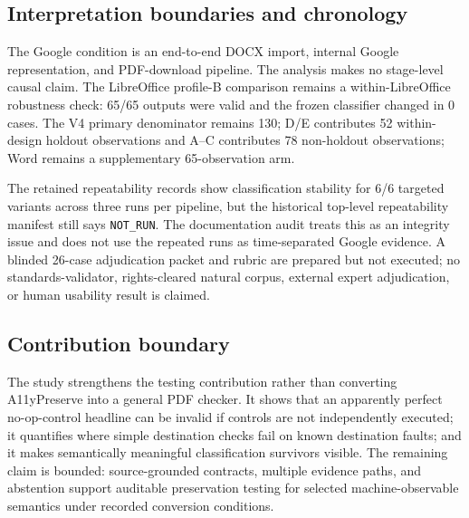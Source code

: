 \subsection{Interpretation boundaries and chronology}
The Google condition is an end-to-end DOCX import, internal Google representation, and PDF-download pipeline. The analysis makes no stage-level causal claim. The LibreOffice profile-B comparison remains a within-LibreOffice robustness check: 65/65 outputs were valid and the frozen classifier changed in 0 cases. The V4 primary denominator remains 130; D/E contributes 52 within-design holdout observations and A--C contributes 78 non-holdout observations; Word remains a supplementary 65-observation arm.

The retained repeatability records show classification stability for 6/6 targeted variants across three runs per pipeline, but the historical top-level repeatability manifest still says \texttt{NOT\_RUN}. The documentation audit treats this as an integrity issue and does not use the repeated runs as time-separated Google evidence. A blinded 26-case adjudication packet and rubric are prepared but not executed; no standards-validator, rights-cleared natural corpus, external expert adjudication, or human usability result is claimed.

\subsection{Contribution boundary}
The study strengthens the testing contribution rather than converting A11yPreserve into a general PDF checker. It shows that an apparently perfect no-op-control headline can be invalid if controls are not independently executed; it quantifies where simple destination checks fail on known destination faults; and it makes semantically meaningful classification survivors visible. The remaining claim is bounded: source-grounded contracts, multiple evidence paths, and abstention support auditable preservation testing for selected machine-observable semantics under recorded conversion conditions.
